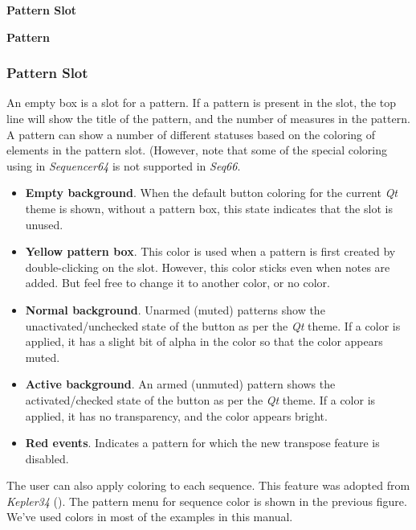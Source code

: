    \begin{enumber}
      \item \textbf{Pattern Slot}
      \item \textbf{Pattern}
   \end{enumber}

\subsubsection{Pattern Slot}
\label{subsubsec:patterns_pattern_slot}

   An empty box is a slot for a pattern.
   If a pattern is present in the slot, the top line will show
   the title of the pattern, and the number of measures in the pattern.
   A pattern can show a number of different statuses based on the coloring
   of elements in the pattern slot.
   (However, note that some of the special coloring using in
   \textsl{Sequencer64} is not supported in \textsl{Seq66}.

   \begin{itemize}
      \item \textbf{Empty background}.  When the default button coloring for
         the current \textsl{Qt} theme is shown, without a pattern box,
         this state indicates that the slot is unused.
      \item \textbf{Yellow pattern box}. This color is used when a pattern is
         first created by double-clicking on the slot.
         However, this color sticks even when notes are added.
         But feel free to change it to another color, or no color.
      \item \textbf{Normal background}.  Unarmed (muted) patterns show the
         unactivated/unchecked state of the button as per the \textsl{Qt}
         theme.  If a color is applied, it has a slight bit of alpha in the
         color so that the color appears muted.
      \item \textbf{Active background}.  An armed (unmuted) pattern shows the
         activated/checked state of the button as per the \textsl{Qt}
         theme.  If a color is applied, it has no transparency, and the 
         color appears bright.
      \item \textbf{Red events}.
         Indicates a pattern for which the new transpose feature is
         disabled.
   \end{itemize}

   The user can also apply coloring to each sequence.
   This feature was adopted from \textsl{Kepler34} (\cite{kepler34}).
   The pattern menu for sequence color is shown in the previous figure.
   We've used colors in most of the examples in this manual.

